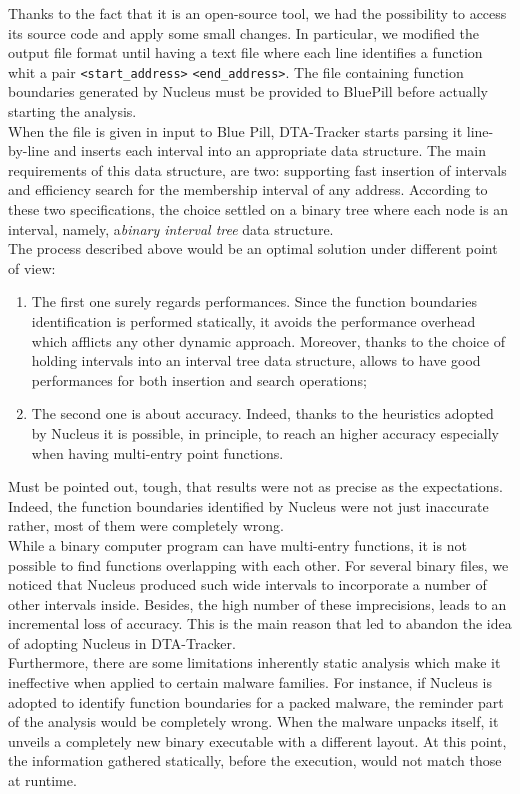 \documentclass[LaM,binding=0.6cm]{sapthesis}
\begin{document}
Thanks to the fact that it is an open-source tool, we had the possibility to access its source code and apply some small changes. In particular, we modified the output file format until having a text file where each line identifies a function whit a pair \texttt{<start\_address>} \texttt{<end\_address>}. The file containing function boundaries generated by Nucleus must be provided to BluePill before actually starting the analysis.\\
When the file is given in input to Blue Pill, DTA-Tracker starts parsing it line-by-line and inserts each interval into an appropriate data structure. The main requirements of this data structure, are two: supporting fast insertion of intervals and efficiency search for the membership interval of any address. According to these two specifications, the choice settled on a binary tree where each node is an interval, namely, a\textit{binary interval tree} data structure.\\ 
The process described above would be an optimal solution under different point of view:
\begin{enumerate}
\item The first one surely regards performances. Since the function boundaries identification is performed statically, it avoids the performance overhead which afflicts any other dynamic approach. Moreover, thanks to the choice of holding intervals into an interval tree data structure, allows to have good performances for both insertion and search operations;
\item The second one is about accuracy. Indeed, thanks to the heuristics adopted by Nucleus it is possible, in principle, to reach an higher accuracy especially when having multi-entry point functions.
\end{enumerate}
Must be pointed out, tough, that results were not as precise as the expectations. Indeed, the function boundaries identified by Nucleus were not just inaccurate rather, most of them were completely wrong.\\

While a binary computer program can have multi-entry functions, it is not possible to find functions overlapping with each other. For several binary files, we noticed that Nucleus produced such wide intervals to incorporate a number of other intervals inside. Besides, the high number of these imprecisions, leads to an incremental loss of accuracy. This is the main reason that led to abandon the idea of adopting Nucleus in DTA-Tracker.\\
Furthermore, there are some limitations inherently static analysis which make it ineffective when applied to certain malware families. For instance, if Nucleus is adopted to identify function boundaries for a packed malware, the reminder part of the analysis would be completely wrong. When the malware unpacks itself, it unveils a completely new binary executable with a different layout. At this point, the information gathered statically, before the execution, would not match those at runtime.
\end{document}
